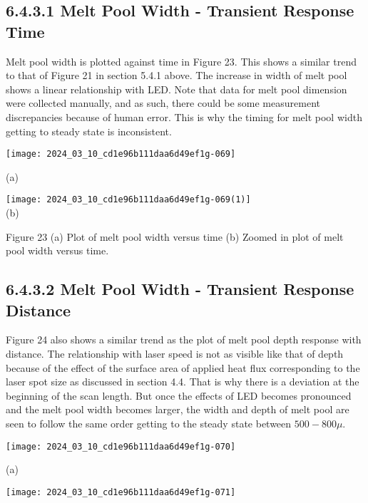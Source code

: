 \documentclass[10pt]{article}
\begin{document}
\subsection*{6.4.3.1 Melt Pool Width - Transient Response Time}
Melt pool width is plotted against time in Figure 23. This shows a similar trend to that of Figure 21 in section 5.4.1 above. The increase in width of melt pool shows a linear relationship with LED. Note that data for melt pool dimension were collected manually, and as such, there could be some measurement discrepancies because of human error. This is why the timing for melt pool width getting to steady state is inconsistent.

\begin{center}
\texttt{[image: 2024\_03\_10\_cd1e96b111daa6d49ef1g-069]}
\end{center}

(a)

\texttt{[image: 2024\_03\_10\_cd1e96b111daa6d49ef1g-069(1)]}\\
(b)

Figure 23 (a) Plot of melt pool width versus time (b) Zoomed in plot of melt pool width versus time.

\subsection*{6.4.3.2 Melt Pool Width - Transient Response Distance}
Figure 24 also shows a similar trend as the plot of melt pool depth response with distance. The relationship with laser speed is not as visible like that of depth because of the effect of the surface area of applied heat flux corresponding to the laser spot size as discussed in section 4.4. That is why there is a deviation at the beginning of the scan length. But once the effects of LED becomes pronounced and the melt pool width becomes larger, the width and depth of melt pool are seen to follow the same order getting to the steady state between $500-800 \mu$.

\begin{center}
\texttt{[image: 2024\_03\_10\_cd1e96b111daa6d49ef1g-070]}
\end{center}

(a)

\begin{center}
\texttt{[image: 2024\_03\_10\_cd1e96b111daa6d49ef1g-071]}
\end{center}
\end{document}
